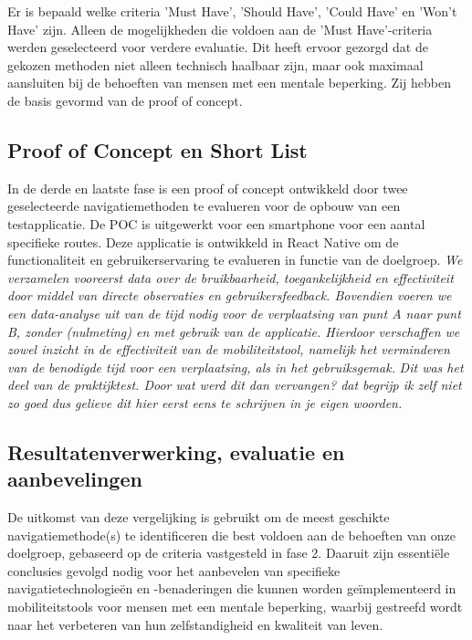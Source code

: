 Er is bepaald welke criteria 'Must Have', 'Should Have', 'Could Have' en 'Won't Have' zijn. Alleen de mogelijkheden die voldoen aan de 'Must Have'-criteria werden geselecteerd voor verdere evaluatie. Dit heeft ervoor gezorgd dat de gekozen methoden niet alleen technisch haalbaar zijn, maar ook maximaal aansluiten bij de behoeften van mensen met een mentale beperking. Zij hebben de basis gevormd van de proof of concept.

\subsection*{Proof of Concept en Short List}

In de derde en laatste fase is een proof of concept ontwikkeld door twee geselecteerde navigatiemethoden te evalueren voor de opbouw van een testapplicatie. De POC is uitgewerkt voor een smartphone voor een aantal specifieke routes. Deze applicatie is ontwikkeld in React Native om de functionaliteit en gebruikerservaring te evalueren in functie van de doelgroep. \textit{We verzamelen vooreerst data over de bruikbaarheid, toegankelijkheid en effectiviteit door middel van directe observaties en gebruikersfeedback. Bovendien voeren we een data-analyse uit van de tijd nodig voor de verplaatsing van punt A naar punt B, zonder (nulmeting) en met gebruik van de applicatie. Hierdoor verschaffen we zowel inzicht in de effectiviteit van de mobiliteitstool, namelijk het verminderen van de benodigde tijd voor een verplaatsing, als in het gebruiksgemak.} \textit{Dit was het deel van de praktijktest. Door wat werd dit dan vervangen? dat begrijp ik zelf niet zo goed dus gelieve dit hier eerst eens te schrijven in je eigen woorden.}

\subsection*{Resultatenverwerking, evaluatie en aanbevelingen}

De uitkomst van deze vergelijking is gebruikt om de meest geschikte navigatiemethode(s) te identificeren die best voldoen aan de behoeften van onze doelgroep, gebaseerd op de criteria vastgesteld in fase 2. Daaruit zijn essentiële conclusies gevolgd nodig voor het aanbevelen van specifieke navigatietechnologieën en -benaderingen die kunnen worden geïmplementeerd in mobiliteitstools voor mensen met een mentale beperking, waarbij gestreefd wordt naar het verbeteren van hun zelfstandigheid en kwaliteit van leven.

